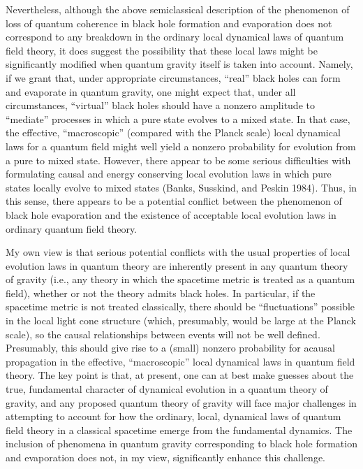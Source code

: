 \documentclass[11pt,a4paper]{article}
\begin{document}
Nevertheless, although the above semiclassical description of the phenomenon of loss of quantum coherence in black hole formation and evaporation does not correspond to any breakdown in the ordinary local dynamical laws of quantum field theory, it does suggest the possibility that these local laws might be significantly modified when quantum gravity itself is taken into account. Namely, if we grant that, under appropriate circumstances, ``real'' black holes can form and evaporate in quantum gravity, one might expect that, under all circumstances, ``virtual'' black holes should have a nonzero amplitude to ``mediate'' processes in which a pure state evolves to a mixed state. In that case, the effective, ``macroscopic'' (compared with the Planck scale) local dynamical laws for a quantum field might well yield a nonzero probability for evolution from a pure to mixed state. However, there appear to be some serious difficulties with formulating causal and energy conserving local evolution laws in which pure states locally evolve to mixed states (Banks, Susskind, and Peskin 1984). Thus, in this sense, there appears to be a potential conflict between the phenomenon of black hole evaporation and the existence of acceptable local evolution laws in ordinary quantum field theory.

My own view is that serious potential conflicts with the usual properties of local evolution laws in quantum theory are inherently present in any quantum theory of gravity (i.e., any theory in which the spacetime metric is treated as a quantum field), whether or not the theory admits black holes. In particular, if the spacetime metric is not treated classically, there should be ``fluctuations'' possible in the local light cone structure (which, presumably, would be large at the Planck scale), so the causal relationships between events will not be well defined. Presumably, this should give rise to a (small) nonzero probability for acausal propagation in the effective, ``macroscopic'' local dynamical laws in quantum field theory. The key point is that, at present, one can at best make guesses about the true, fundamental character of dynamical evolution in a quantum theory of gravity, and any proposed quantum theory of gravity will face major \hypertarget{source-196}{} challenges in attempting to account for how the ordinary, local, dynamical laws of quantum field theory in a classical spacetime emerge from the fundamental dynamics. The inclusion of phenomena in quantum gravity corresponding to black hole formation and evaporation does not, in my view, significantly enhance this challenge.
\end{document}
